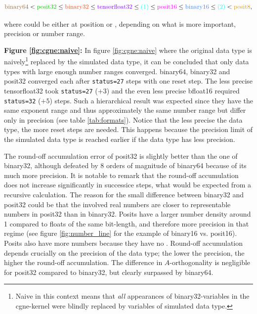 \documentclass{article}
\theoremstyle{plain} %
\theoremstyle{convention} %
\theoremstyle{remark} %
\def\code#1{\texttt{#1}}
\numberwithin{equation}{section}
\begin{document}
\begin{align}
    \textcolor{cbrown}{\text{binary64}} < \textcolor{cgreen}{\text{posit32}} \leq \textcolor{cred}{\text{binary32}} \leq \textcolor{cpurple}{\text{tensorfloat32}} \leq \textcolor{cturquois}{\text{(1)}} \leq \textcolor{cpink}{\text{posit16}} \leq \textcolor{cblue}{\text{binary16}} \leq \textcolor{cturquois}{\text{(2)}} < \textcolor{cyellow}{\text{posit8}}, \label{eq:hierarchy}
\end{align}

where \textcolor{cturquois}{} could be either at position \textcolor{cturquois}{} or \textcolor{cturquois}{}, depending on what is more important, precision or number range.

\textbf{Figure \ref{fig:cgne:naive}:} In figure \ref{fig:cgne:naive} where the original data type is naively\footnote{Naive in this context means that \textit{all} appearances of binary32-variables in the cgne-kernel were blindly replaced by variables of simulated data type.} replaced by the simulated data type, it can be concluded that only data types with large enough number ranges converged. \gls{binary64}, \gls{binary32} and \gls{posit32} converged each after \code{status=27} steps with one reset step. The less precise \gls{tensorfloat32} took \code{status=27} ($+3$) and the even less precise \gls{bfloat16} required \code{status=32} ($+5$) steps. Such a hierarchical result was expected since they have the same exponent range and thus approximately the same number range but differ only in precision (see table \ref{tab:formats}). Notice that the less precise the data type, the more reset steps are needed. This happens because the precision limit of the simulated data type is reached earlier if the data type has less precision.

The round-off accumulation error of \gls{posit32} is slightly better than the one of \gls{binary32}, although defeated by $8$ orders of magnitude of \gls{binary64} because of its much more precision. It is notable to remark that the round-off accumulation does not increase significantly in successice steps, what would be expected from a recursive calculation. The reason for the small difference between \gls{binary32} and \gls{posit32} could be that the involved real numbers are closer to representable numbers in \gls{posit32} than in \gls{binary32}. Posits have a larger number density around \num{1} compared to floats of the same bit-length, and therefore more precision in that regime (see figure \ref{fig:number_line} for the example of \gls{binary16} vs. \gls{posit16}). Posits also have more numbers because they have no . Round-off accumulation depends crucially on the precision of the data type; the lower the precision, the higher the round-off accumulation. The difference in $A$-orthogonality is negligible for \gls{posit32} compared to \gls{binary32}, but clearly surpassed by \gls{binary64}.
\end{document}
